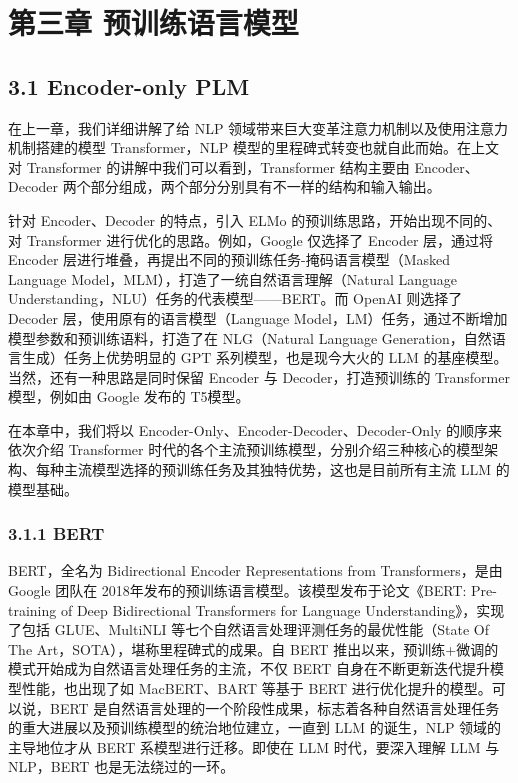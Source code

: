 \documentclass[
]{article}
\author{}
\date{}
\begin{document}
{
\setcounter{tocdepth}{3}
\tableofcontents
}
\section{第三章
预训练语言模型}\label{ux7b2cux4e09ux7ae0-ux9884ux8badux7ec3ux8bedux8a00ux6a21ux578b}

\subsection{3.1 Encoder-only PLM}\label{encoder-only-plm}

在上一章，我们详细讲解了给 NLP
领域带来巨大变革注意力机制以及使用注意力机制搭建的模型 Transformer，NLP
模型的里程碑式转变也就自此而始。在上文对 Transformer
的讲解中我们可以看到，Transformer 结构主要由 Encoder、Decoder
两个部分组成，两个部分分别具有不一样的结构和输入输出。

针对 Encoder、Decoder 的特点，引入 ELMo 的预训练思路，开始出现不同的、对
Transformer 进行优化的思路。例如，Google 仅选择了 Encoder 层，通过将
Encoder 层进行堆叠，再提出不同的预训练任务-掩码语言模型（Masked Language
Model，MLM），打造了一统自然语言理解（Natural Language
Understanding，NLU）任务的代表模型------BERT。而 OpenAI 则选择了 Decoder
层，使用原有的语言模型（Language
Model，LM）任务，通过不断增加模型参数和预训练语料，打造了在 NLG（Natural
Language Generation，自然语言生成）任务上优势明显的 GPT
系列模型，也是现今大火的 LLM 的基座模型。当然，还有一种思路是同时保留
Encoder 与 Decoder，打造预训练的 Transformer 模型，例如由 Google 发布的
T5模型。

在本章中，我们将以 Encoder-Only、Encoder-Decoder、Decoder-Only
的顺序来依次介绍 Transformer
时代的各个主流预训练模型，分别介绍三种核心的模型架构、每种主流模型选择的预训练任务及其独特优势，这也是目前所有主流
LLM 的模型基础。

\subsubsection{3.1.1 BERT}\label{bert}

BERT，全名为 Bidirectional Encoder Representations from
Transformers，是由 Google 团队在
2018年发布的预训练语言模型。该模型发布于论文《BERT: Pre-training of Deep
Bidirectional Transformers for Language Understanding》，实现了包括
GLUE、MultiNLI 等七个自然语言处理评测任务的最优性能（State Of The
Art，SOTA），堪称里程碑式的成果。自 BERT
推出以来，预训练+微调的模式开始成为自然语言处理任务的主流，不仅 BERT
自身在不断更新迭代提升模型性能，也出现了如 MacBERT、BART 等基于 BERT
进行优化提升的模型。可以说，BERT
是自然语言处理的一个阶段性成果，标志着各种自然语言处理任务的重大进展以及预训练模型的统治地位建立，一直到
LLM 的诞生，NLP 领域的主导地位才从 BERT 系模型进行迁移。即使在 LLM
时代，要深入理解 LLM 与 NLP，BERT 也是无法绕过的一环。
\end{document}
